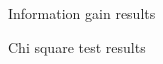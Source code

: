 \begin{figure}[H]
    \label{fig:ig}
    \caption{Information gain results}
\end{figure}

\begin{figure}[H]
    \label{fig:chi_square}
    \caption{Chi square test results} 
\end{figure}

